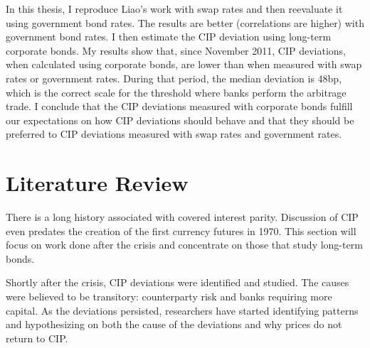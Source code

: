 In this thesis, I reproduce Liao's work with swap rates and then reevaluate it using government bond rates.  The results are better (correlations are higher) with government bond rates.  I then estimate the CIP deviation using long-term corporate bonds.  My results show that, since November 2011, CIP deviations, when calculated using corporate bonds, are lower than when measured with swap rates or government rates.  During that period, the median deviation is 48bp, which is the correct scale for the threshold where banks perform the arbitrage trade.  I conclude that the CIP deviations measured with corporate bonds fulfill our expectations on how CIP deviations should behave and that they should be preferred to CIP deviations measured with swap rates and government rates.






\section{Literature Review}


There is a long history associated with covered interest parity.  Discussion of CIP even predates the creation of the first currency futures in 1970.\cite{Kolb2010}  This section will focus on work done after the crisis and concentrate on those that study long-term bonds.  


Shortly after the crisis, CIP deviations were identified and studied.  The causes were believed to be transitory: counterparty risk and banks requiring more capital.\cite{Coffey2009}  As the deviations persisted, researchers have started identifying patterns and hypothesizing on both the cause of the deviations and why prices do not return to CIP. 

